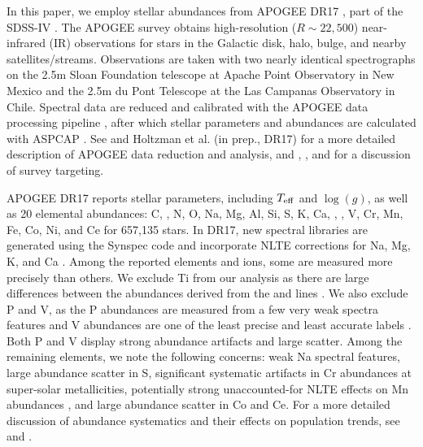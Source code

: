 \documentclass[modern, linenumbers]{aastex631}
\newcommand{\logg}{\log(g)}
\newcommand{\teff}{T_{\rm eff}}
\begin{document}
In this paper, we employ stellar abundances from APOGEE DR17 \citep{abdurrouf2022}, part of the SDSS-IV \citep{majewski2017}. The APOGEE survey obtains high-resolution ($R\sim22,500$) near-infrared (IR) observations \citep{wilson2019} for stars in the Galactic disk, halo, bulge, and nearby satellites/streams. Observations are taken with two nearly identical spectrographs on the 2.5m Sloan Foundation telescope \citep{wilson2019} at Apache Point Observatory in New Mexico and the 2.5m du Pont Telescope \citep{bowen1973} at the Las Campanas Observatory in Chile. Spectral data are reduced and calibrated with the APOGEE data processing pipeline \citep{nidever2015}, after which stellar parameters and abundances are calculated with ASPCAP \citep[APOGEE Stellar Parameter and Chemical Abundance Pipeline;][]{holtzman2015, garcia2016}. See \citet[][DR16]{jonsson2020} and Holtzman et al. (in prep., DR17) for a more detailed description of APOGEE data reduction and analysis, and \citet{zasowski2013, zasowski2017}, \citet{beaton2021}, and \citet{santana2021} for a discussion of survey targeting.

APOGEE DR17 reports stellar parameters, including $\teff$ and $\logg$, as well as 20 elemental abundances: C, , N, O, Na, Mg, Al, Si, S, K, Ca, , , V, Cr, Mn, Fe, Co, Ni, and Ce for 657,135 stars. In DR17, new spectral libraries \citep{hubeny2021} are generated using the Synspec code and incorporate NLTE corrections for Na, Mg, K, and Ca \citep{osorio2020}. Among the reported elements and ions, some are measured more precisely than others. We exclude Ti from our analysis as there are large differences between the abundances derived from the  and  lines \citep{jonsson2020}. We also exclude P and V, as the P abundances are measured from a few very weak spectra features and V abundances are one of the least precise and least accurate labels \citep{jonsson2020}. Both P and V display strong abundance artifacts and large scatter. Among the remaining elements, we note the following concerns: weak Na spectral features, large abundance scatter in S, significant systematic artifacts in Cr abundances at super-solar metallicities, potentially strong unaccounted-for NLTE effects on Mn abundances \citep{bergemann2019}, and large abundance scatter in Co and Ce. For a more detailed discussion of abundance systematics and their effects on population trends, see \citet{jonsson2020} and \citet{griffith2021a}.
\end{document}
